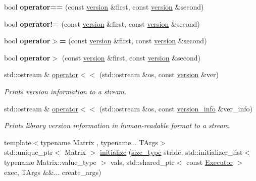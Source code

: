 \begin{DoxyCompactItemize}
\item 
\mbox{\label{namespacegko_aeeaafa7179e5dbc1f1c02197598664fb}} 
bool {\bfseries operator==} (const \hyperlink{structgko_1_1version}{version} \&first, const \hyperlink{structgko_1_1version}{version} \&second)
\item 
\mbox{\label{namespacegko_af2d150bb18c9fbdc62c2a02315bd908b}} 
bool {\bfseries operator!=} (const \hyperlink{structgko_1_1version}{version} \&first, const \hyperlink{structgko_1_1version}{version} \&second)
\item 
\mbox{\label{namespacegko_ac033cb13ef2c4d291a894f26d2c64862}} 
bool {\bfseries operator$>$=} (const \hyperlink{structgko_1_1version}{version} \&first, const \hyperlink{structgko_1_1version}{version} \&second)
\item 
\mbox{\label{namespacegko_aa6724904a78b5293c610d113e3b23682}} 
bool {\bfseries operator$>$} (const \hyperlink{structgko_1_1version}{version} \&first, const \hyperlink{structgko_1_1version}{version} \&second)
\item 
std\+::ostream \& \hyperlink{namespacegko_ae0ef652f487afe43aebcf778038ff780}{operator$<$$<$} (std\+::ostream \&os, const \hyperlink{structgko_1_1version}{version} \&ver)
\begin{DoxyCompactList}\small\item\em Prints version information to a stream. \end{DoxyCompactList}\item 
std\+::ostream \& \hyperlink{namespacegko_ad9e3ba96a10fe47a03ceef39b45bd43c}{operator$<$$<$} (std\+::ostream \&os, const \hyperlink{classgko_1_1version__info}{version\+\_\+info} \&ver\+\_\+info)
\begin{DoxyCompactList}\small\item\em Prints library version information in human-\/readable format to a stream. \end{DoxyCompactList}\item 
{\footnotesize template$<$typename Matrix , typename... T\+Args$>$ }\\std\+::unique\+\_\+ptr$<$ Matrix $>$ \hyperlink{group__LinOp_ga2f54bac1e95fb3ef03974fa9c9088491}{initialize} (\hyperlink{namespacegko_a6e5c95df0ae4e47aab2f604a22d98ee7}{size\+\_\+type} stride, std\+::initializer\+\_\+list$<$ typename Matrix\+::value\+\_\+type $>$ vals, std\+::shared\+\_\+ptr$<$ const \hyperlink{classgko_1_1Executor}{Executor} $>$ exec, T\+Args \&\&... create\+\_\+args)

\end{DoxyCompactItemize}
